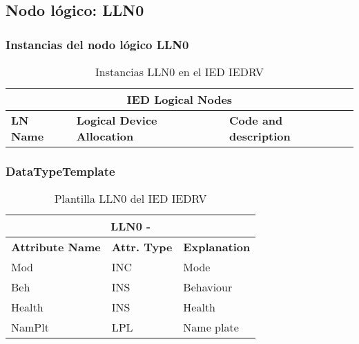 
\subsection{Nodo l\'ogico: 			 LLN0}

    \subsubsection{Instancias del nodo l\'ogico LLN0}
    \begin{table}[H]
    \begin{center}
    \begin{tabular}{|l|l|p{6.8cm}|}
            \hline
            \multicolumn{3}{|c|}{\cellcolor[gray]{0.8} \textbf{IED Logical Nodes} } \\
            \hline
            \textbf{LN Name} & \textbf{Logical Device Allocation} & \textbf{Code and description} \\
            \hline
    \end{tabular}
    \caption{Instancias LLN0 en el IED IEDRV}
    \label{table:lnInstLLN0_1}
    \end{center}
    \end{table}
    
    
    
    \subsubsection{DataTypeTemplate}
    \begin{table}[H]
    \begin{center}
    \begin{tabular}{|l|l|p{8.5cm}|}
            \hline
            \multicolumn{3}{|c|}{\cellcolor[gray]{0.8} \textbf{ LLN0}  -  } \\
            \hline
            \textbf{Attribute Name} & \textbf{Attr. Type} & \textbf{Explanation} \\
            \hline 
            Mod & INC & Mode \\
            \hline
            Beh & INS & Behaviour \\
            \hline
            Health & INS & Health \\
            \hline
            NamPlt & LPL & Name plate \\
            \hline
    \end{tabular}
    \caption{Plantilla LLN0 del IED IEDRV}
    \label{table:lnTypeLLN0_1}
    \end{center}
    \end{table}
    
    
    